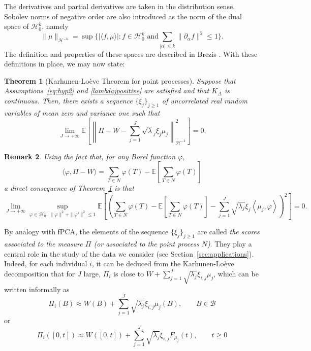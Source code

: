 \documentclass[aos]{imsart}
\theoremstyle{plain}
\newtheorem{theorem}{Theorem}[section]
\newtheorem{remark}[theorem]{Remark}
\theoremstyle{remark}
\newcommand{\1}{1}
\begin{document}
	The derivatives and partial derivatives are taken in the distribution sense.	 
	Sobolev norms of negative order are also introduced as the norm of the dual space of $\mathcal H_0^{k}$, namely
	 \[
\|\mu\|_{\mathcal H^{-k}} = \sup\Bigg\{|\langle f,\mu\rangle|:f\in\mathcal H_0^{k} \text{ and}\sum_{|\alpha|\leq k}\|\partial_{\alpha}f\|^2\leq 1 \Bigg\}. 
\]
The definition and properties of these spaces are described in Brezis \cite[Chapters 8, 9]{Brezis11}. With these definitions in place, we may now state:
\begin{theorem}[Karhunen-Lo\`eve Theorem for point processes]
\label{thm:KL}
Suppose that Assumptions~\eqref{eq:hyp2} and \eqref{lambdajpositive} are satisfied and that $K_\Delta$ is continuous. Then, there exists a sequence $\{\xi_j\}_{j\geq 1}$ of uncorrelated real random variables of mean zero and variance one such that
\[
\lim_{J\to+\infty}\mathbb E\left[\left\|\Pi-W-\sum_{j=1}^J\sqrt\lambda_j\xi_j\mu_j\right\|_{\mathcal H^{-1}}^2\right]=0.
\]
\end{theorem}
\begin{remark}
Using the fact that, for any Borel function $\varphi$,
$$
\langle \varphi,\Pi-W\rangle=\sum_{T\in N}\varphi(T)-\mathbb E\left[\sum_{T\in N}\varphi(T)\right]
$$
a direct consequence of Theorem~\ref{thm:KL} is that 
\begin{equation*}%
\lim_{J\to+\infty}\sup_{\varphi\in \mathcal H^1_0,\, \|\varphi\|^2+ \|\varphi'\|^2\leq 1}\mathbb E\left[\left(\sum_{T\in N}\varphi(T)-\mathbb E\left[\sum_{T\in N}\varphi(T)\right]-\sum_{j=1}^J\sqrt{\lambda_j}\xi_j \left\langle\mu_j,\varphi\right\rangle\right)^2\right]=0.
\end{equation*}
\end{remark}
By analogy with fPCA, the elements of the sequence $\{\xi_j\}_{j\geq 1}$ are called \textit{the scores associated to the measure $\Pi$ (or associated to  the point process $N$)}. They play a central role in the study of the data we consider (see Section~\ref{sec:applications}). 
Indeed, for each individual $i$, it can be deduced from the Karhunen-Lo\`eve decomposition that for $J$ large, $\Pi_i$ is close to $W+ \sum_{j=1}^J\sqrt{\lambda_j}\xi_{i,j}\mu_j$, which can be written informally as
\begin{equation}\label{representation}
\Pi_i(B) \approx W(B)+ \sum_{j=1}^J\sqrt{\lambda_j}\xi_{i,j}\mu_j(B), \qquad B\in\mathcal B
\end{equation}
or
\begin{equation}\Pi_i([0,t]) \approx W([0,t])+ \sum_{j=1}^J\sqrt{\lambda_j}\xi_{i,j}F_{\mu_j}(t), \qquad t\geq 0
\end{equation}
\end{document}
